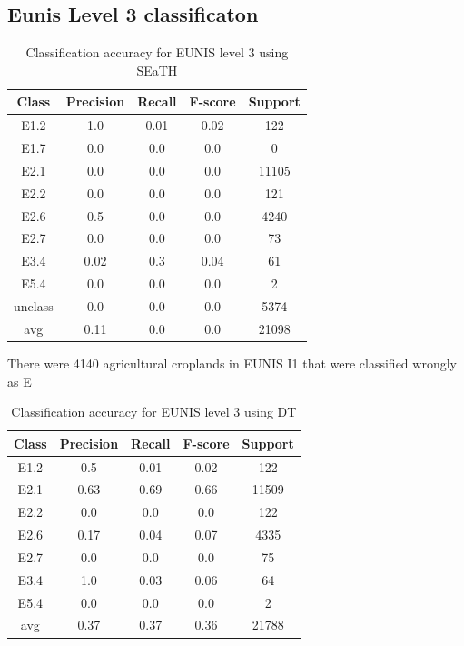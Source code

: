 \documentclass[authoryear, review,12pt,number]{elsarticle}
\begin{document}
{\subsection{Eunis Level 3 classificaton}
\begin{table}
\centering
\begin{tabular}{c c c c c}
Class & Precision & Recall & F-score & Support\\
\hline
E1.2 & 1.0 & 0.01 & 0.02 & 122\\
E1.7 & 0.0 & 0.0 & 0.0 & 0\\
E2.1 & 0.0 & 0.0 & 0.0 & 11105\\
E2.2 & 0.0 & 0.0 & 0.0 & 121\\
E2.6 & 0.5 & 0.0 & 0.0 & 4240\\
E2.7 & 0.0 & 0.0 & 0.0 & 73\\
E3.4 & 0.02 & 0.3 & 0.04 & 61\\
E5.4 & 0.0 & 0.0 & 0.0 & 2\\
unclass & 0.0 & 0.0 & 0.0 & 5374\\
avg & 0.11 & 0.0 & 0.0 & 21098\\
\end{tabular}
\caption{Classification accuracy for EUNIS level 3 using SEaTH}
\end{table}
There were 4140 agricultural croplands in EUNIS I1 that were classified wrongly 
as E 
\begin{table}
\centering
\begin{tabular}{c c c c c}
Class & Precision & Recall & F-score & Support\\
\hline
E1.2 & 0.5 & 0.01 & 0.02 & 122\\
E2.1 & 0.63 & 0.69 & 0.66 & 11509\\
E2.2 & 0.0 & 0.0 & 0.0 & 122\\
E2.6 & 0.17 & 0.04 & 0.07 & 4335\\
E2.7 & 0.0 & 0.0 & 0.0 & 75\\
E3.4 & 1.0 & 0.03 & 0.06 & 64\\
E5.4 & 0.0 & 0.0 & 0.0 & 2\\
avg & 0.37 & 0.37 & 0.36 & 21788\\
\end{tabular}
\caption{Classification accuracy for EUNIS level 3 using DT}
\end{table}

}
\end{document}
